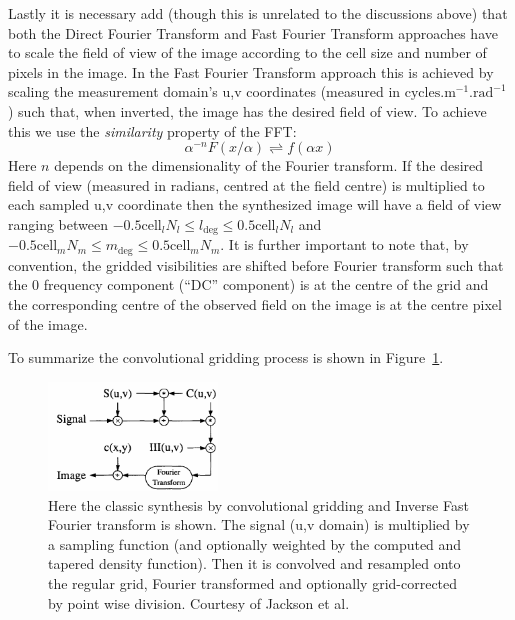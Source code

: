  Lastly it is necessary add (though this is unrelated to the discussions above) that both the Direct Fourier Transform and Fast Fourier Transform approaches
 have to scale the field of view of the image according to the cell size and number of pixels in the image. In the Fast Fourier Transform approach this is 
 achieved by scaling the measurement domain's u,v coordinates (measured in $\text{cycles}.\text{m}^{-1}.\text{rad}^{-1}$) such that, when inverted, the image
 has the desired field of view. To achieve this we use the \emph{similarity} property of the FFT:
 \begin{equation}
  \alpha^{-n}F(x/\alpha) \rightleftharpoons f(\alpha x)
 \end{equation}
 Here $n$ depends on the dimensionality of the Fourier transform. If the desired field of view (measured in radians, centred at the field centre) is multiplied to 
 each sampled u,v coordinate then the synthesized image will have a field of view ranging between $-0.5\text{cell}_{l}N_l\leq l_{\text{deg}}\leq0.5\text{cell}_{l}N_l$ and 
 $-0.5\text{cell}_{m}N_m\leq m_{\text{deg}}\leq0.5\text{cell}_{m}N_m$. It is further important to note that, by convention, the gridded visibilities are shifted before Fourier 
 transform such that the 0 frequency component (``DC'' component) is at the centre of the grid and the corresponding centre of the 
 observed field on the image is at the centre pixel of the image.
 
 To summarize the convolutional gridding process is shown in Figure~\ref{fig_synth_pipeline}.
 \begin{figure}[h]
  \begin{mdframed}
    \centering
    \includegraphics[width=0.4\textwidth]{images/convolutional_gridding_flow.png}
    \caption[Synthesis using convolutional gridding]{Here the classic synthesis by convolutional gridding and Inverse Fast Fourier transform is shown.
    The signal (u,v domain) is multiplied by a sampling function (and optionally weighted by the computed and tapered density function). Then it is convolved
    and resampled onto the regular grid, Fourier transformed and optionally grid-corrected by point wise division. Courtesy of Jackson et al.\cite{jackson1991selection}}
    \label{fig_synth_pipeline}
  \end{mdframed}
 \end{figure}
 

